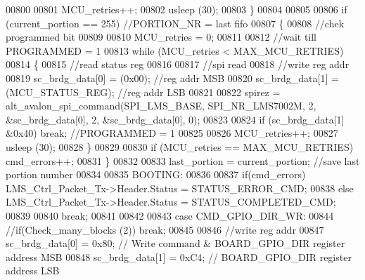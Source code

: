 \begin{DoxyCode}
00800 
00801                         MCU_retries++;
00802                         usleep (30);
00803                     \}
00804 
00805 
00806                     \textcolor{keywordflow}{if} (current_portion  == 255) \textcolor{comment}{//PORTION\_NR = last fifo}
00807                     \{
00808                         \textcolor{comment}{//chek programmed bit}
00809 
00810                         MCU_retries = 0;
00811 
00812                         \textcolor{comment}{//wait till PROGRAMMED = 1}
00813                         \textcolor{keywordflow}{while} (MCU_retries < MAX_MCU_RETRIES)
00814                         \{
00815                             \textcolor{comment}{//read status reg}
00816 
00817                             \textcolor{comment}{//spi read}
00818                             \textcolor{comment}{//write reg addr}
00819                             sc_brdg_data[0] = (0x00); \textcolor{comment}{//reg addr MSB}
00820                             sc_brdg_data[1] = (MCU_STATUS_REG); \textcolor{comment}{//reg addr LSB}
00821 
00822                             spirez = alt_avalon_spi_command(SPI_LMS_BASE, 
      SPI_NR_LMS7002M, 2, &sc_brdg_data[0], 2, &sc_brdg_data[0], 0);
00823 
00824                             \textcolor{keywordflow}{if} (sc_brdg_data[1] &0x40) \textcolor{keywordflow}{break}; \textcolor{comment}{//PROGRAMMED = 1}
00825 
00826                             MCU_retries++;
00827                             usleep (30);
00828                         \}
00829 
00830                         \textcolor{keywordflow}{if} (MCU_retries == MAX_MCU_RETRIES) cmd_errors++;
00831                     \}
00832 
00833                     last_portion = current_portion; \textcolor{comment}{//save last portion number}
00834 
00835                     BOOTING:
00836 
00837                     \textcolor{keywordflow}{if}(cmd_errors) LMS\_Ctrl\_Packet\_Tx->Header.Status = 
      STATUS_ERROR_CMD;
00838                     \textcolor{keywordflow}{else} LMS\_Ctrl\_Packet\_Tx->Header.Status = 
      STATUS_COMPLETED_CMD;
00839 
00840                 \textcolor{keywordflow}{break};
00841 
00842 
00843                 \textcolor{keywordflow}{case} CMD_GPIO_DIR_WR:
00844                     \textcolor{comment}{//if(Check\_many\_blocks (2)) break;}
00845 
00846                     \textcolor{comment}{//write reg addr}
00847                     sc_brdg_data[0] = 0x80;     \textcolor{comment}{// Write command & BOARD\_GPIO\_DIR register address MSB}
00848                     sc_brdg_data[1] = 0xC4;     \textcolor{comment}{// BOARD\_GPIO\_DIR register address LSB}

\end{DoxyCode}
